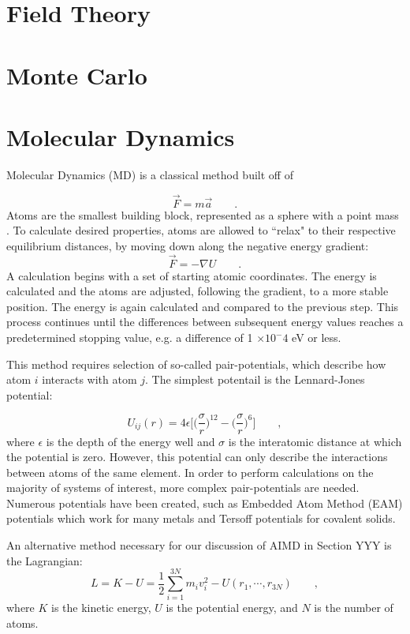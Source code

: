 \documentclass[3p,review,12pt]{elsarticle}
\begin{document}
\section{Field Theory}

\section{Monte Carlo}

\section{Molecular Dynamics}

Molecular Dynamics (MD) is a classical method built off of

\begin{equation}
\vec{F}=m\vec{a} \qquad .
\end{equation}
Atoms are the smallest building block, represented as a sphere with a point mass \cite{Lee2012}. To calculate desired properties, atoms are allowed to ``relax" to their respective equilibrium distances, by moving down along the negative energy gradient:
\begin{equation}
\vec{F} = - \nabla U \qquad .
\end{equation}
A calculation begins with a set of starting atomic coordinates. The energy is calculated and the atoms are adjusted, following the gradient, to a more stable position. The energy is again calculated and compared to the previous step. This process continues until the differences between subsequent energy values reaches a predetermined stopping value, e.g. a difference of 1 $\times 10^-4$ eV or less.
\par
This method requires selection of so-called pair-potentials, which describe how atom $i$ interacts with atom $j$. The simplest potentail is the Lennard-Jones potential:

\begin{equation}
U_{ij}(r) = 4\epsilon \Bigg[\bigg(\frac{\sigma}{r}\bigg)^{12}-\bigg(\frac{\sigma}{r}\bigg)^{6}\Bigg] \qquad ,
\end{equation}
where $\epsilon$ is the depth of the energy well and $\sigma$ is the interatomic distance at which the potential is zero. However, this potential can only describe the interactions between atoms of the same element. In order to perform calculations on the majority of systems of interest, more complex pair-potentials are needed. Numerous potentials have been created, such as Embedded Atom Method (EAM) potentials which work for many metals and Tersoff potentials for covalent solids. 
\par 
An alternative method necessary for our discussion of AIMD in Section YYY is the Lagrangian:
\begin{equation}
L = K-U = \frac{1}{2}\sum_{i=1}^{3N}m_{i}v^{2}_{i}-U(r_{1}, \cdots, r_{3N})\qquad ,
\end{equation}
where $K$ is the kinetic energy, $U$ is the potential energy, and $N$ is the number of atoms.
\end{document}
